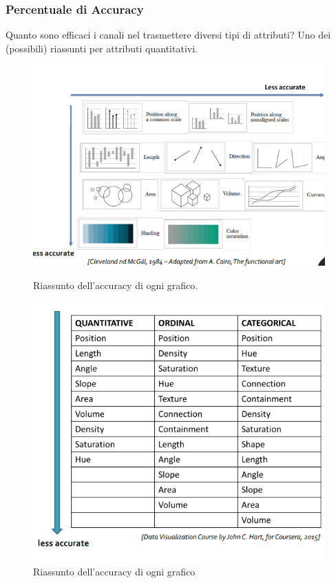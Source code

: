 \subsubsection{Percentuale di Accuracy}
Quanto sono efficaci i canali nel trasmettere diversi tipi di attributi?
Uno dei (possibili) riassunti per attributi quantitativi.
\begin{figure}[H]
    \centering
    \begin{minipage}{0.45\textwidth}
        \centering
        \includegraphics[width=\linewidth]{images/percentAcc1.png} 
        \caption{Riassunto dell'accuracy di ogni grafico.}
        \label{fig:immagine1}
    \end{minipage}\hfill
    \begin{minipage}{0.45\textwidth}
        \centering
        \includegraphics[width=\linewidth]{images/percentAcc2.png} 
        \caption{Riassunto dell'accuracy di ogni grafico}
        \label{fig:immagine2}
    \end{minipage}
\end{figure}
